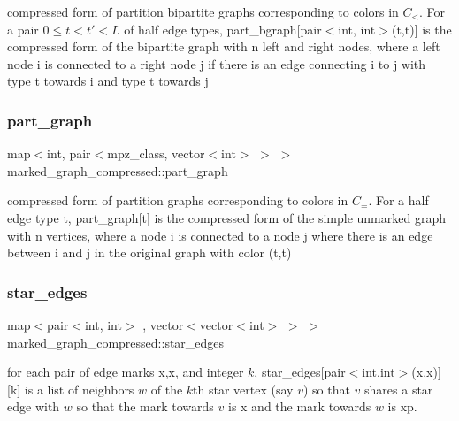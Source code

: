 compressed form of partition bipartite graphs corresponding to colors in $C_<$. For a pair $0 \leq t < t' < L$ of half edge types, part\+\_\+bgraph\mbox{[}pair$<$int, int$>$(t,t\textquotesingle{})\mbox{]} is the compressed form of the bipartite graph with n left and right nodes, where a left node i is connected to a right node j if there is an edge connecting i to j with type t towards i and type t\textquotesingle{} towards j 

\mbox{\label{classmarked__graph__compressed_ae179a4737e6eab905c18a94d44ef64b7}} 
\subsubsection{\texorpdfstring{part\+\_\+graph}{part\_graph}}
{\footnotesize\ttfamily map$<$int, pair$<$mpz\+\_\+class, vector$<$int$>$ $>$ $>$ marked\+\_\+graph\+\_\+compressed\+::part\+\_\+graph}



compressed form of partition graphs corresponding to colors in $C_=$. For a half edge type t, part\+\_\+graph\mbox{[}t\mbox{]} is the compressed form of the simple unmarked graph with n vertices, where a node i is connected to a node j where there is an edge between i and j in the original graph with color (t,t) 

\mbox{\label{classmarked__graph__compressed_a7df5779d313486644132bd816937f532}} 
\subsubsection{\texorpdfstring{star\+\_\+edges}{star\_edges}}
{\footnotesize\ttfamily map$<$pair$<$int, int$>$ , vector$<$vector$<$int$>$ $>$ $>$ marked\+\_\+graph\+\_\+compressed\+::star\+\_\+edges}



for each pair of edge marks x,x\textquotesingle{}, and integer $k$, star\+\_\+edges\mbox{[}pair$<$int,int$>$(x,x\textquotesingle{})\mbox{]}\mbox{[}k\mbox{]} is a list of neighbors $w$ of the $k$th star vertex (say $v$) so that $v$ shares a star edge with $w$ so that the mark towards $v$ is x and the mark towards $w$ is xp. 

